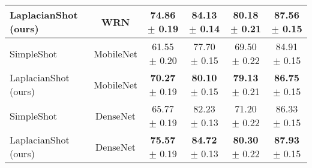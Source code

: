 \documentclass{article}
\begin{document}
\begin{table*}[t]
\begin{center}
\begin{small}
\begin{tabular}{lc|cc|cc}
\rowcolor{Gray}
LaplacianShot (ours) & WRN & \textbf{74.86} $\pm$ 0.19 & \textbf{84.13} $\pm$ 0.14& \textbf{80.18} $\pm$ 0.21 & \textbf{87.56}$\pm$ 0.15\\
\hline
SimpleShot \cite{wang2019simpleshot}& MobileNet & 61.55 $\pm$ 0.20 & 77.70 $\pm$ 0.15& 69.50 $\pm$ 0.22 & 84.91 $\pm$ 0.15\\
\rowcolor{Gray}
LaplacianShot (ours) & MobileNet & \textbf{70.27} $\pm$ 0.19 & \textbf{80.10} $\pm$ 0.15& \textbf{79.13} $\pm$ 0.21 & \textbf{86.75} $\pm$ 0.15\\
\hline
SimpleShot \cite{wang2019simpleshot}& DenseNet& 65.77 $\pm$ 0.19 & 82.23 $\pm$ 0.13&71.20 $\pm$ 0.22 & 86.33 $\pm$ 0.15\\
\rowcolor{Gray}
LaplacianShot (ours) & DenseNet & \textbf{75.57} $\pm$ 0.19 & \textbf{84.72} $\pm$ 0.13& \textbf{80.30} $\pm$ 0.22 & \textbf{87.93} $\pm$ 0.15\\
\bottomrule
\end{tabular}
\end{small}
\end{center}
\vskip -0.1in
\end{table*}
\end{document}

